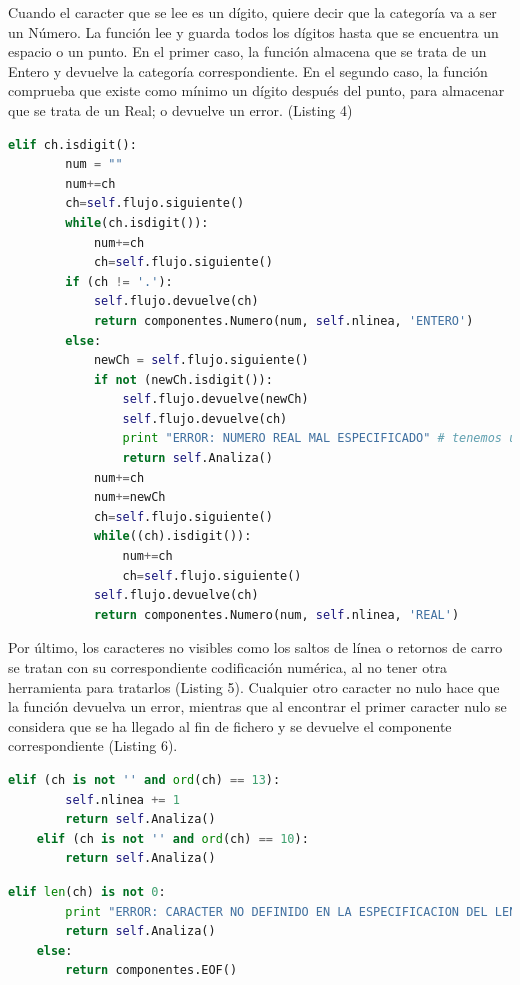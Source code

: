 \documentclass[11pt]{article}
\begin{document}
Cuando el caracter que se lee es un dígito, quiere decir que la categoría va a ser un Número. La función lee y guarda todos los dígitos hasta que se encuentra un espacio o un punto. En el primer caso, la función almacena que se trata de un Entero y devuelve la categoría correspondiente. En el segundo caso, la función comprueba que existe como mínimo un dígito después del punto, para almacenar que se trata de un Real; o devuelve un error. (Listing 4) 

\begin{minipage}{\linewidth}
	\begin{lstlisting}[language=Python, caption=Detección de números]
		elif ch.isdigit():
		num = ""
		num+=ch
		ch=self.flujo.siguiente()
		while(ch.isdigit()):
			num+=ch
			ch=self.flujo.siguiente()
		if (ch != '.'):
			self.flujo.devuelve(ch)
			return componentes.Numero(num, self.nlinea, 'ENTERO')
		else:
			newCh = self.flujo.siguiente()
			if not (newCh.isdigit()):
				self.flujo.devuelve(newCh)
				self.flujo.devuelve(ch)
				print "ERROR: NUMERO REAL MAL ESPECIFICADO" # tenemos un comentario no abierto
				return self.Analiza()
			num+=ch
			num+=newCh
			ch=self.flujo.siguiente()
			while((ch).isdigit()):
				num+=ch
				ch=self.flujo.siguiente()
			self.flujo.devuelve(ch)
			return componentes.Numero(num, self.nlinea, 'REAL')
	\end{lstlisting}
\end{minipage}


Por último, los caracteres no visibles como los saltos de línea o retornos de carro se tratan con su correspondiente codificación numérica, al no tener otra herramienta para tratarlos (Listing 5). Cualquier otro caracter no nulo hace que la función devuelva un error, mientras que al encontrar el primer caracter nulo se considera que se ha llegado al fin de fichero y se devuelve el componente correspondiente (Listing 6).

\begin{lstlisting}[language=Python, caption=Caracteres no visibles]
	elif (ch is not '' and ord(ch) == 13):
    	self.nlinea += 1
    	return self.Analiza()
	elif (ch is not '' and ord(ch) == 10):
    	return self.Analiza()
\end{lstlisting}

\begin{lstlisting}[language=Python, caption=Errores y fin de fichero]
	elif len(ch) is not 0:
    	print "ERROR: CARACTER NO DEFINIDO EN LA ESPECIFICACION DEL LENGUAJE"
    	return self.Analiza()
	else:
    	return componentes.EOF()
\end{lstlisting}
\end{document}

